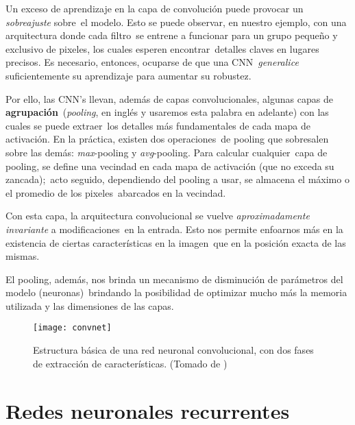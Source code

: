 \noindent
Un exceso de aprendizaje en la capa de convolución puede provocar un \emph{sobreajuste} sobre\
el modelo. Esto se puede observar, en nuestro ejemplo, con una arquitectura donde cada filtro\
se entrene a funcionar para un grupo pequeño y exclusivo de pixeles, los cuales esperen encontrar\
detalles claves en lugares precisos. Es necesario, entonces, ocuparse de que una CNN\
\emph{generalice} suficientemente su aprendizaje para aumentar su robustez.\par
Por ello, las CNN's llevan, además de capas convolucionales, algunas capas de \textbf{agrupación}\
(\emph{pooling}, en inglés y usaremos esta palabra en adelante) con las cuales se puede extraer\
los detalles más fundamentales de cada mapa de activación. En la práctica, existen dos operaciones\
de pooling que sobresalen sobre las demás: \emph{max}-pooling y \emph{avg}-pooling. Para calcular cualquier\
capa de pooling, se define una vecindad en cada mapa de activación (que no exceda su zancada);\
acto seguido, dependiendo del pooling a usar, se almacena el máximo o el promedio de los pixeles\
abarcados en la vecindad.\par
Con esta capa, la arquitectura convolucional se vuelve \textit{aproximadamente \emph{invariante}} a modificaciones\
en la entrada. Esto nos permite enfoarnos más en la existencia de ciertas características en la imagen\
que en la posición exacta de las mismas.\par
El pooling, además, nos brinda un mecanismo de disminución de parámetros del modelo (neuronas)\
brindando la posibilidad de optimizar mucho más la memoria utilizada y las dimensiones de las capas.

\begin{figure}
  \centering
  \texttt{[image: convnet]}
  \caption{Estructura básica de una red neuronal convolucional, con dos fases de extracción de características.
    (Tomado de \cite{lecun2010})}
  \label{convnet_fig}
\end{figure}


\section{Redes neuronales recurrentes}


